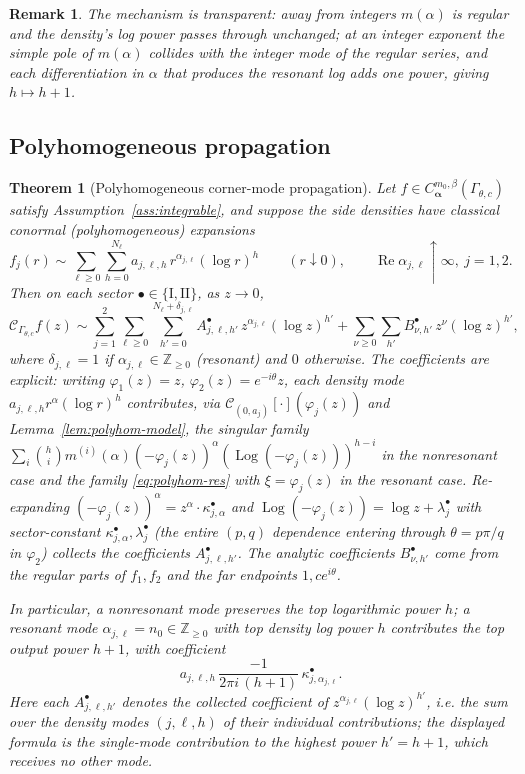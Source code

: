 \documentclass[pdflatex,sn-mathphys-num]{sn-jnl}%
\newcommand{\Z}{\mathbb{Z}}
\newcommand{\Cau}{\mathcal{C}}
\newcommand{\Gw}{\Gamma_{\theta,c}}
\newcommand{\Real}{\operatorname{Re}}
\newcommand{\bd}{\boldsymbol}
\newcommand{\Log}{\operatorname{Log}}
\theoremstyle{thmstyleone}
\newtheorem{theorem}{Theorem}
\theoremstyle{thmstyletwo}
\newtheorem{remark}{Remark}
\theoremstyle{thmstylethree}
\begin{document}
\begin{remark}
The mechanism is transparent: away from integers $m(\alpha)$ is regular and the
density's log power passes through unchanged; at an integer exponent the simple
pole of $m(\alpha)$ collides with the integer mode of the regular series, and
each differentiation in $\alpha$ that produces the resonant log adds one power,
giving $h\mapsto h+1$.
\end{remark}

\subsection{Polyhomogeneous propagation}

\begin{theorem}[Polyhomogeneous corner-mode propagation]\label{thm:propagation}
Let $f\in C^{m_0,\beta}_{\bd\alpha}(\Gw)$ satisfy
Assumption~\ref{ass:integrable}, and suppose the side densities have classical
conormal (polyhomogeneous) expansions
\[
  f_j(r)\sim\sum_{\ell\ge0}\sum_{h=0}^{N_\ell}
     a_{j,\ell,h}\,r^{\alpha_{j,\ell}}(\log r)^{h}
  \qquad(r\downarrow0),\qquad \Real\alpha_{j,\ell}\uparrow\infty,\ j=1,2 .
\]
Then on each sector $\bullet\in\{\mathrm I,\mathrm{II}\}$, as $z\to0$,
\begin{equation}\label{eq:propagation}
  \Cau_{\Gw}f(z)\sim
  \sum_{j=1}^{2}\sum_{\ell\ge0}\sum_{h'=0}^{N_\ell+\delta_{j,\ell}}
     A^{\bullet}_{j,\ell,h'}\,z^{\alpha_{j,\ell}}(\log z)^{h'}
  +\sum_{\nu\ge0}\sum_{h'}B^{\bullet}_{\nu,h'}\,z^{\nu}(\log z)^{h'},
\end{equation}
where $\delta_{j,\ell}=1$ if $\alpha_{j,\ell}\in\Z_{\ge0}$ (resonant) and $0$
otherwise. The coefficients are explicit: writing $\varphi_1(z)=z$,
$\varphi_2(z)=e^{-i\theta}z$, each density mode $a_{j,\ell,h}r^{\alpha}(\log r)^h$
contributes, via $\Cau_{(0,a_j)}[\cdot](\varphi_j(z))$ and
Lemma~\ref{lem:polyhom-model}, the singular family
$\sum_i\binom{h}{i}m^{(i)}(\alpha)(-\varphi_j(z))^{\alpha}(\Log(-\varphi_j(z)))^{h-i}$
in the nonresonant case and the family \eqref{eq:polyhom-res} with
$\xi=\varphi_j(z)$ in the resonant case. Re-expanding $(-\varphi_j(z))^{\alpha}
=z^{\alpha}\cdot\kappa^{\bullet}_{j,\alpha}$ and
$\Log(-\varphi_j(z))=\log z+\lambda^{\bullet}_{j}$ with sector-constant
$\kappa^{\bullet}_{j,\alpha},\lambda^{\bullet}_{j}$ (the entire $(p,q)$
dependence entering through $\theta=p\pi/q$ in $\varphi_2$) collects the
coefficients $A^{\bullet}_{j,\ell,h'}$. The analytic coefficients
$B^{\bullet}_{\nu,h'}$ come from the regular parts of $f_1,f_2$ and the far
endpoints $1,ce^{i\theta}$.

In particular, a nonresonant mode preserves the top logarithmic power $h$; a
resonant mode $\alpha_{j,\ell}=n_0\in\Z_{\ge0}$ with top density log power
$h$ contributes the top output power $h+1$, with coefficient
\[
  a_{j,\ell,h}\,\frac{-1}{2\pi i\,(h+1)}\,\kappa^{\bullet}_{j,\alpha_{j,\ell}} .
\]
Here each $A^{\bullet}_{j,\ell,h'}$ denotes the \emph{collected} coefficient of
$z^{\alpha_{j,\ell}}(\log z)^{h'}$, i.e. the sum over the density modes
$(j,\ell,h)$ of their individual contributions; the displayed formula is the
single-mode contribution to the highest power $h'=h+1$, which receives no other
mode.
\end{theorem}
\end{document}
